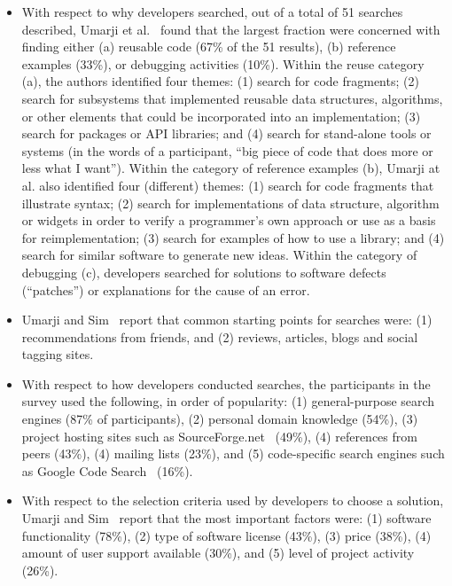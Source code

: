 \documentclass{casicswhitepaper}
\begin{document}
\begin{itemize}

\item With respect to why developers searched, out of a total of 51 searches described, Umarji et al.~\cite{umarji_2008} found that the largest fraction were concerned with finding either (a) reusable code (67\% of the 51 results), (b) reference examples (33\%), or debugging activities (10\%).  Within the reuse category (a), the authors identified four themes: (1) search for code fragments; (2) search for subsystems that implemented reusable data structures, algorithms, or other elements that could be incorporated into an implementation; (3) search for packages or API libraries; and (4) search for stand-alone tools or systems (in the words of a participant, ``big piece of code that does more or less what I want'').  Within the category of reference examples (b), Umarji at al. also identified four (different) themes: (1) search for code fragments that illustrate syntax; (2) search for implementations of data structure, algorithm or widgets in order to verify a programmer's own approach or use as a basis for reimplementation; (3) search for examples of how to use a library; and (4) search for similar software to generate new ideas.  Within the category of debugging (c), developers searched for solutions to software defects (``patches'') or explanations for the cause of an error.

\item Umarji and Sim~\cite{umarji_2013} report that common starting points for searches were: (1) recommendations from friends, and (2) reviews, articles, blogs and social tagging sites.

\item With respect to how developers conducted searches, the participants in the survey used the following, in order of popularity: (1) general-purpose search engines (87\% of participants), (2) personal domain knowledge (54\%), (3) project hosting sites such as SourceForge.net~\cite{sourceforge_1999} (49\%), (4) references from peers (43\%), (4) mailing lists (23\%), and (5) code-specific search engines such as Google Code Search~\cite{googlecodesearch_2006} (16\%).

\item With respect to the selection criteria used by developers to choose a solution, Umarji and Sim~\cite{umarji_2013} report that the most important factors were: (1) software functionality (78\%), (2) type of software license (43\%), (3) price (38\%), (4) amount of user support available (30\%), and (5) level of project activity (26\%).

\end{itemize}
\end{document}
